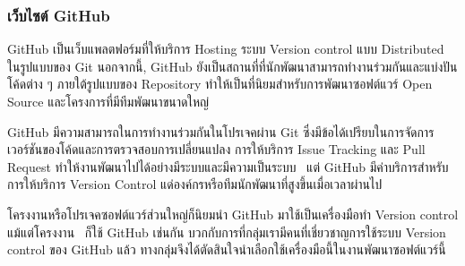 \documentclass[12pt,one side,openright,a4paper]{cpe-thesis-th}
\newcommand{\thaijustify}[1]{%
  \par\hspace{30pt}\justifying
  #1
}
\begin{document}
\subsubsection{เว็บไซต์ GitHub}
\thaijustify{
  GitHub เป็นเว็บแพลตฟอร์มที่ให้บริการ Hosting ระบบ Version control แบบ Distributed ในรูปแบบของ Git นอกจากนี้, GitHub ยังเป็นสถานที่ที่นักพัฒนาสามารถทำงานร่วมกันและแบ่งปันโค้ดต่าง ๆ ภายใต้รูปแบบของ Repository ทำให้เป็นที่นิยมสำหรับการพัฒนาซอฟต์แวร์ Open Source และโครงการที่มีทีมพัฒนาขนาดใหญ่~\cite{github}
}
\thaijustify{
  GitHub มีความสามารถในการทำงานร่วมกันในโปรเจคผ่าน Git ซึ่งมีข้อได้เปรียบในการจัดการเวอร์ชันของโค้ดและการตรวจสอบการเปลี่ยนแปลง การให้บริการ Issue Tracking และ Pull Request ทำให้งานพัฒนาไปได้อย่างมีระบบและมีความเป็นระบบ~\cite{github, chacon14} แต่ GitHub มีค่าบริการสำหรับการให้บริการ Version Control แด่องค์กรหรือทีมนักพัฒนาที่สูงขึ้นเมื่อเวลาผ่านไป~\cite{githubprice}
}
\thaijustify{
  โครงงานหรือโปรเจคซอฟต์แวร์ส่วนใหญ่ก็นิยมนำ GitHub มาใช้เป็นเครื่องมือทำ Version control แม้แต่โครงงาน~\cite{nattawat20pgs} ก็ใช้ GitHub เช่นกัน บวกกับการที่กลุ่มเรามีคนที่เชี่ยวชาญการใช้ระบบ Version control ของ GitHub แล้ว ทางกลุ่มจึงได้ตัดสินใจนำเลือกใช้เครื่องมือนี้ในงานพัฒนาซอฟต์แวร์นี้
}
\end{document}
